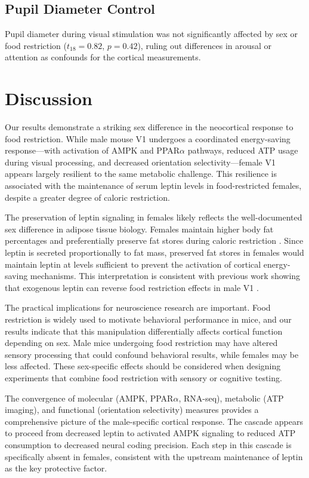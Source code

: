 \documentclass[11pt]{article}
\begin{document}
\subsection{Pupil Diameter Control}

Pupil diameter during visual stimulation was not significantly affected by sex or food restriction ($t_{18} = 0.82$, $p = 0.42$), ruling out differences in arousal or attention as confounds for the cortical measurements.

\section{Discussion}

Our results demonstrate a striking sex difference in the neocortical response to food restriction. While male mouse V1 undergoes a coordinated energy-saving response---with activation of AMPK and PPAR$\alpha$ pathways, reduced ATP usage during visual processing, and decreased orientation selectivity---female V1 appears largely resilient to the same metabolic challenge. This resilience is associated with the maintenance of serum leptin levels in food-restricted females, despite a greater degree of caloric restriction.

The preservation of leptin signaling in females likely reflects the well-documented sex difference in adipose tissue biology. Females maintain higher body fat percentages and preferentially preserve fat stores during caloric restriction \citep{valle2005}. Since leptin is secreted proportionally to fat mass, preserved fat stores in females would maintain leptin at levels sufficient to prevent the activation of cortical energy-saving mechanisms. This interpretation is consistent with previous work showing that exogenous leptin can reverse food restriction effects in male V1 \citep{padamsey2022}.

The practical implications for neuroscience research are important. Food restriction is widely used to motivate behavioral performance in mice, and our results indicate that this manipulation differentially affects cortical function depending on sex. Male mice undergoing food restriction may have altered sensory processing that could confound behavioral results, while females may be less affected. These sex-specific effects should be considered when designing experiments that combine food restriction with sensory or cognitive testing.

The convergence of molecular (AMPK, PPAR$\alpha$, RNA-seq), metabolic (ATP imaging), and functional (orientation selectivity) measures provides a comprehensive picture of the male-specific cortical response. The cascade appears to proceed from decreased leptin to activated AMPK signaling to reduced ATP consumption to decreased neural coding precision. Each step in this cascade is specifically absent in females, consistent with the upstream maintenance of leptin as the key protective factor.
\end{document}
